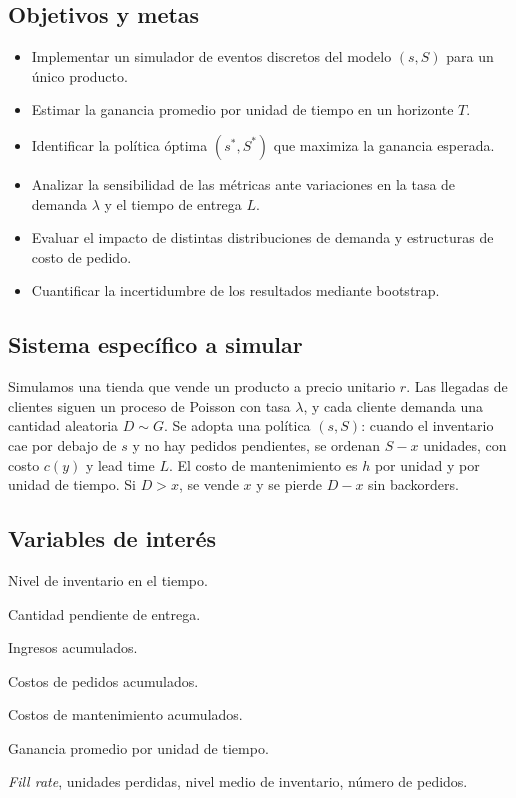 \documentclass[12pt,a4paper]{article}
\begin{document}
\subsection{Objetivos y metas}
\begin{itemize}
  \item Implementar un simulador de eventos discretos del modelo $(s,S)$ para un único producto.
  \item Estimar la ganancia promedio por unidad de tiempo en un horizonte $T$.
  \item Identificar la política óptima $(s^*,S^*)$ que maximiza la ganancia esperada.
  \item Analizar la sensibilidad de las métricas ante variaciones en la tasa de demanda $\lambda$ y el tiempo de entrega $L$.
  \item Evaluar el impacto de distintas distribuciones de demanda y estructuras de costo de pedido.
  \item Cuantificar la incertidumbre de los resultados mediante bootstrap.
\end{itemize}

\subsection{Sistema específico a simular}
Simulamos una tienda que vende un producto a precio unitario $r$. Las llegadas de clientes siguen un proceso de Poisson con tasa $\lambda$, y cada cliente demanda una cantidad aleatoria $D\sim G$. Se adopta una política $(s,S)$: cuando el inventario cae por debajo de $s$ y no hay pedidos pendientes, se ordenan $S-x$ unidades, con costo $c(y)$ y lead time $L$. El costo de mantenimiento es $h$ por unidad y por unidad de tiempo. Si $D>x$, se vende $x$ y se pierde $D-x$ sin backorders.

\subsection{Variables de interés}
\begin{description}
  \item[$x(t)$] Nivel de inventario en el tiempo.
  \item[$y(t)$] Cantidad pendiente de entrega.
  \item[$R$] Ingresos acumulados.
  \item[$C$] Costos de pedidos acumulados.
  \item[$H$] Costos de mantenimiento acumulados.
  \item[$\pi = (R - C - H)/T$] Ganancia promedio por unidad de tiempo.
  \item \emph{Fill rate}, unidades perdidas, nivel medio de inventario, número de pedidos.
\end{description}
\end{document}
